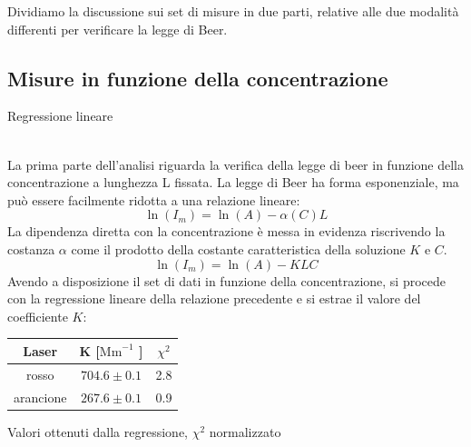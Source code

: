 \documentclass[letterpaper,11pt]{article}
\begin{document}
\begin{body}
Dividiamo la discussione sui set di misure in due parti, relative alle due modalità differenti per verificare la legge di Beer. 
\subsection{Misure in funzione della concentrazione}

\begin{figurehere}
\centering
{}
\caption{Regressione lineare}
\end{figurehere}\leavevmode
\\
La prima parte dell'analisi riguarda la verifica della legge di beer in funzione della concentrazione a lunghezza L fissata. La legge di Beer ha forma esponenziale, ma può essere facilmente ridotta a una relazione lineare: 
\begin{equation}
\ln(I_m) = \ln(A) - \alpha(C) L
\end{equation}
La dipendenza diretta con la concentrazione è messa in evidenza riscrivendo la costanza $\alpha$ come il prodotto della costante caratteristica della soluzione $K$ e $C$.
\begin{equation}
\label{reg}
\ln(I_m) = \ln(A) - KLC
\end{equation}
Avendo a disposizione il set di dati in funzione della concentrazione, si procede con la regressione lineare della relazione precedente e si estrae il valore del coefficiente $K$:\\

\begin{tablehere}
\centering
\begin{tabular}{c|c|c}
\toprule
Laser& K [$\text{Mm}^{-1}$ ]& $\chi^2$\\
\midrule
rosso &  $704.6\pm 0.1 $& 2.8 \\
arancione & $267.6\pm 0.1$  & 0.9 \\
\bottomrule
\end{tabular}
\caption{Valori ottenuti dalla regressione, $\chi^2$ normalizzato}
\end{tablehere}\leavevmode

\end{body}
\end{document}
